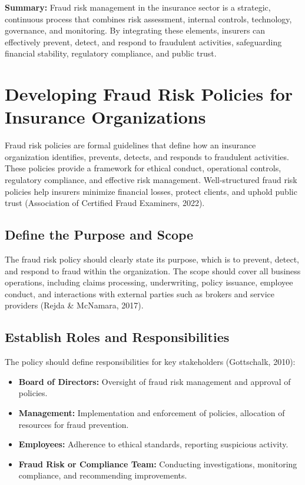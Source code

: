 \documentclass[12pt,a4paper]{article}
\begin{document}
\begin{example}
\textbf{Summary:} Fraud risk management in the insurance sector is a strategic, continuous process that combines risk assessment, internal controls, technology, governance, and monitoring. By integrating these elements, insurers can effectively prevent, detect, and respond to fraudulent activities, safeguarding financial stability, regulatory compliance, and public trust.
\end{example}

\section{Developing Fraud Risk Policies for Insurance Organizations}

Fraud risk policies are formal guidelines that define how an insurance organization identifies, prevents, detects, and responds to fraudulent activities. These policies provide a framework for ethical conduct, operational controls, regulatory compliance, and effective risk management. Well-structured fraud risk policies help insurers minimize financial losses, protect clients, and uphold public trust (Association of Certified Fraud Examiners, 2022).

\subsection{Define the Purpose and Scope}
The fraud risk policy should clearly state its purpose, which is to prevent, detect, and respond to fraud within the organization. The scope should cover all business operations, including claims processing, underwriting, policy issuance, employee conduct, and interactions with external parties such as brokers and service providers (Rejda \& McNamara, 2017).

\subsection{Establish Roles and Responsibilities}
The policy should define responsibilities for key stakeholders (Gottschalk, 2010):
\begin{itemize}
    \item \textbf{Board of Directors:} Oversight of fraud risk management and approval of policies.
    \item \textbf{Management:} Implementation and enforcement of policies, allocation of resources for fraud prevention.
    \item \textbf{Employees:} Adherence to ethical standards, reporting suspicious activity.
    \item \textbf{Fraud Risk or Compliance Team:} Conducting investigations, monitoring compliance, and recommending improvements.
\end{itemize}
\end{document}
